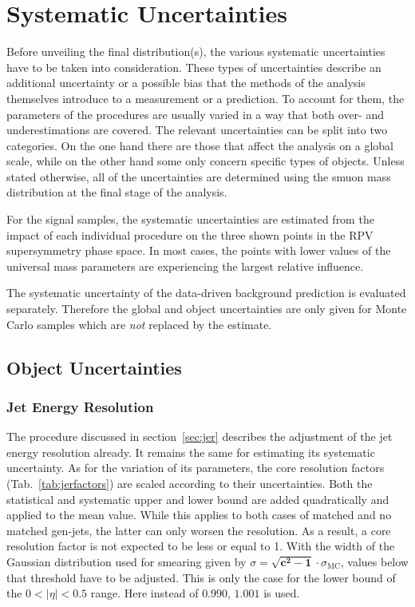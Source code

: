 \chapter{Systematic Uncertainties}
\label{cha:systematics}

Before unveiling the final distribution(s), the various systematic uncertainties have to be taken into consideration. These types of uncertainties describe an additional uncertainty or a possible bias that the methods of the analysis themselves introduce to a measurement or a prediction. To account for them, the parameters of the procedures are usually varied in a way that both over- and underestimations are covered. The relevant uncertainties can be split into two categories. On the one hand there are those that affect the analysis on a global scale, while on the other hand some only concern specific types of objects. Unless stated otherwise, all of the uncertainties are determined using the smuon mass distribution at the final stage of the analysis.

For the signal samples, the systematic uncertainties are estimated from the impact of each individual procedure on the three shown points in the RPV supersymmetry phase space. In most cases, the points with lower values of the universal mass parameters are experiencing the largest relative influence. 

The systematic uncertainty of the data-driven background prediction is evaluated separately. Therefore the global and object uncertainties are only given for Monte Carlo samples which are \textit{not} replaced by the estimate.

\section{Object Uncertainties}
\label{sec:objsys}

\subsection{Jet Energy Resolution}
\label{sec:jersys}

The procedure discussed in section~\ref{sec:jer} describes the adjustment of the jet energy resolution already. It remains the same for estimating its systematic uncertainty. As for the variation of its parameters, the core resolution factors (Tab.~\ref{tab:jerfactors}) are scaled according to their uncertainties. Both the statistical and systematic upper and lower bound are added quadratically and applied to the mean value. While this applies to both cases of matched and no matched gen-jets, the latter can only worsen the resolution. As a result, a core resolution factor is not expected to be less or equal to 1. With the width of the Gaussian distribution used for smearing given by $\sigma = \mathbf{\sqrt{c^2-1}} \cdot \sigma_{\text{MC}}$, values below that threshold have to be adjusted. This is only the case for the lower bound of the $0 < |\eta| < 0.5$ range. Here instead of $0.990$, $1.001$ is used. 

